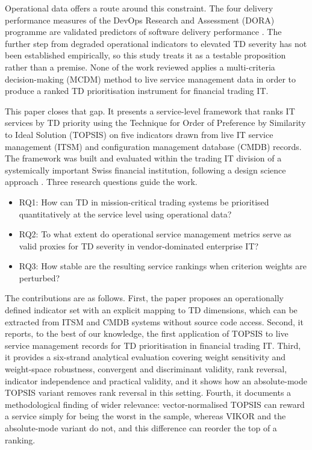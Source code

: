 \documentclass[
  journal,
]{IEEEtran}%
\providecommand{\tightlist}{%
  \setlength{\itemsep}{0pt}\setlength{\parskip}{0pt}}
\begin{document}
Operational data offers a route around this constraint. The four
delivery performance measures of the DevOps Research and Assessment
(DORA) programme are validated predictors of software delivery
performance . The further
step from degraded operational indicators to elevated TD severity has
not been established empirically, so this study treats it as a testable
proposition rather than a premise. None of the work reviewed applies a
multi-criteria decision-making (MCDM) method to live service management
data in order to produce a ranked TD prioritisation instrument for
financial trading IT.

This paper closes that gap. It presents a service-level framework that
ranks IT services by TD priority using the Technique for Order of
Preference by Similarity to Ideal Solution (TOPSIS)
 on five
indicators drawn from live IT service management (ITSM) and
configuration management database (CMDB) records. The framework was
built and evaluated within the trading IT division of a systemically
important Swiss financial institution, following a design science
approach .
Three research questions guide the work.

\begin{itemize}
\tightlist
\item
  RQ1: How can TD in mission-critical trading systems be prioritised
  quantitatively at the service level using operational data?
\item
  RQ2: To what extent do operational service management metrics serve as
  valid proxies for TD severity in vendor-dominated enterprise IT?
\item
  RQ3: How stable are the resulting service rankings when criterion
  weights are perturbed?
\end{itemize}

The contributions are as follows. First, the paper proposes an
operationally defined indicator set with an explicit mapping to TD
dimensions, which can be extracted from ITSM and CMDB systems without
source code access. Second, it reports, to the best of our knowledge,
the first application of TOPSIS to live service management records for
TD prioritisation in financial trading IT. Third, it provides a
six-strand analytical evaluation covering weight sensitivity and
weight-space robustness, convergent and discriminant validity, rank
reversal, indicator independence and practical validity, and it shows
how an absolute-mode TOPSIS variant removes rank reversal in this
setting. Fourth, it documents a methodological finding of wider
relevance: vector-normalised TOPSIS can reward a service simply for
being the worst in the sample, whereas VIKOR and the absolute-mode
variant do not, and this difference can reorder the top of a ranking.
\end{document}

